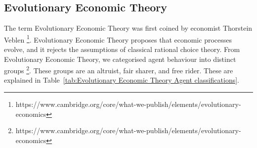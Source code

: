 \subsection{Evolutionary Economic Theory}
The term Evolutionary Economic Theory was first coined by economist Thorstein Veblen \footnote{https://www.cambridge.org/core/what-we-publish/elements/evolutionary-economics}. Evolutionary Economic Theory proposes that economic processes evolve, and it rejects the assumptions of classical rational choice theory. From Evolutionary Economic Theory, we categorised agent behaviour into distinct groups \footnote{https://www.cambridge.org/core/what-we-publish/elements/evolutionary-economics}. These groups are an altruist, fair sharer, and free rider. These are explained in Table~\ref{tab:Evolutionary Economic Theory Agent classifications}.

